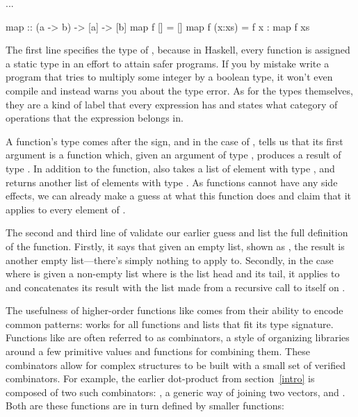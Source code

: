 \documentclass[../paper.tex]{subfiles}
\begin{document}
...




\begin{code}
map :: (a -> b) -> [a] -> [b]
map f []     = []
map f (x:xs) = f x : map f xs
\end{code}

The first line specifies the type of , because in Haskell, every function is assigned a static type in an effort to attain safer programs. If you by mistake write a program that tries to multiply some integer by a boolean type, it won't even compile and instead warns you about the type error. As for the types themselves, they are a kind of label that every expression has and states what category of operations that the expression belongs in.

A function's type comes after the \codei{::} sign, and in the case of , tells us that its first argument is a function  which, given an argument of type , produces a result of type . In addition to the function,  also takes a list  of element with type , and returns another list of elements with type . As functions cannot have any side effects, we can already make a guess at what this function does and claim that it applies  to every element of .

The second and third line of  validate our earlier guess and list the full definition of the function. Firstly, it says that given an empty list, shown as \codei{[]}, the result is another empty list---there's simply nothing to apply  to. Secondly, in the case where  is given a non-empty list  where  is the list head and  its tail, it applies  to  and concatenates its result with the list made from a recursive call to itself on .

The usefulness of higher-order functions like  comes from their ability to encode common patterns:  works for all functions and lists that fit its type signature. Functions like  are often referred to as combinators, a style of organizing libraries around a few primitive values and functions for combining them. These combinators allow for complex structures to be built with a small set of verified combinators. For example, the earlier dot-product from section~\ref{intro} is composed of two such combinators: , a generic way of joining two vectors, and . Both are these functions are in turn defined by smaller functions:
\end{document}
